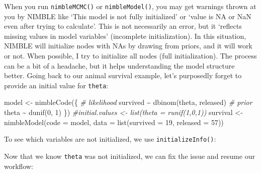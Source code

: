 \documentclass[
  12pt,
]{krantz}
\newenvironment{Shaded}{\begin{snugshade}}{\end{snugshade}}
\newcommand{\AttributeTok}[1]{\textcolor[rgb]{0.77,0.63,0.00}{#1}}
\newcommand{\CommentTok}[1]{\textcolor[rgb]{0.56,0.35,0.01}{\textit{#1}}}
\newcommand{\DecValTok}[1]{\textcolor[rgb]{0.00,0.00,0.81}{#1}}
\newcommand{\FunctionTok}[1]{\textcolor[rgb]{0.00,0.00,0.00}{#1}}
\newcommand{\NormalTok}[1]{#1}
\newcommand{\OtherTok}[1]{\textcolor[rgb]{0.56,0.35,0.01}{#1}}
\newcommand{\SpecialCharTok}[1]{\textcolor[rgb]{0.00,0.00,0.00}{#1}}
\begin{document}
When you run \texttt{nimbleMCMC()} or \texttt{nimbleModel()}, you may get warnings thrown at you by NIMBLE like `This model is not fully initialized' or `value is NA or NaN even after trying to calculate'. This is not necessarily an error, but it `reflects missing values in model variables' (incomplete initialization). In this situation, NIMBLE will initialize nodes with NAs by drawing from priors, and it will work or not. When possible, I try to initialize all nodes (full initialization). The process can be a bit of a headache, but it helps understanding the model structure better. Going back to our animal survival example, let's purposedly forget to provide an initial value for \texttt{theta}:

\begin{Shaded}
\begin{Highlighting}[]
\NormalTok{model }\OtherTok{\textless{}{-}} \FunctionTok{nimbleCode}\NormalTok{(\{}
  \CommentTok{\# likelihood}
\NormalTok{  survived }\SpecialCharTok{\textasciitilde{}} \FunctionTok{dbinom}\NormalTok{(theta, released)}
  \CommentTok{\# prior}
\NormalTok{  theta }\SpecialCharTok{\textasciitilde{}} \FunctionTok{dunif}\NormalTok{(}\DecValTok{0}\NormalTok{, }\DecValTok{1}\NormalTok{)}
\NormalTok{\})}
\CommentTok{\#initial.values \textless{}{-} list(theta = runif(1,0,1))}
\NormalTok{survival }\OtherTok{\textless{}{-}} \FunctionTok{nimbleModel}\NormalTok{(}\AttributeTok{code =}\NormalTok{ model, }
                        \AttributeTok{data =} \FunctionTok{list}\NormalTok{(}\AttributeTok{survived =} \DecValTok{19}\NormalTok{, }\AttributeTok{released =} \DecValTok{57}\NormalTok{))}
\end{Highlighting}
\end{Shaded}

To see which variables are not initialized, we use \texttt{initializeInfo()}:

\begin{Shaded}
\end{Shaded}

Now that we know \texttt{theta} was not initialized, we can fix the issue and resume our workflow:
\end{document}
